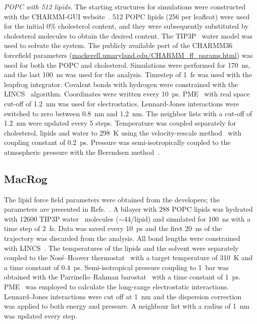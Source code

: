 \documentclass[journal=jacsat,manuscript=article]{achemso}
\begin{document}
{\it POPC with 512 lipids.}
%
The starting structures for simulations were constructed with
the CHARMM-GUI website~\cite{jo08}. 512 POPC lipids (256 per leafleat) were 
used for the initial 0\% cholesterol content, and they were subsequently 
substituted by cholesterol molecules to obtain the desired content.
The TIP3P~\cite{jorgensen83} water model was used to solvate the system. 
The publicly available port of the CHARMM36~\cite{klauda10} forcefield parameters (\url{mackerell.umaryland.edu/CHARMM_ff_params.html}) 
was used for both the POPC and cholesterol. 
Simulations were performed for 170~ns, and the last 100~ns was used for the analysis.
Timestep of 1~fs was used with the leapfrog integrator. Covalent bonds with hydrogen 
were constrained with the LINCS~\cite{hess97,hess07} algorithm. Coordinates were written every 10~ps.
PME~\cite{darden93,essman95} with real space cut-off of 1.2~nm was used for electrostatics. Lennard-Jones 
interactions were switched to zero between 0.8~nm and 1.2~nm. The neighbor lists with a
cut-off of 1.2~nm were updated every 5 steps. Temperature was coupled separately for cholesterol, lipids
and water to 298~K using the velocity-rescale method~\cite{bussi07} with coupling constant of 0.2~ps.
Pressure was semi-isotropically coupled to the atmospheric pressure with the Berendsen
method~\cite{berendsen84}.

\subsection{MacRog}
The lipid force field parameters were obtained from the developers; the parameters are presented in Refs.~. 
A bilayer with 288 POPC lipids was hydrated with 12600 TIP3P water~\cite{jorgensen83} molecules ($\sim$44/lipid) and simulated for 100~ns with a time step of 2~fs. Data was saved 
every 10~ps and the first 20~ns of the trajectory was discarded from the analysis. 
All bond lengths were constrained with LINCS~\cite{hess97,hess07}. The temperatures of the lipids and the solvent were separately coupled to the Nos\'{e}--Hoover thermostat~\cite{nose84,hoover85} 
with a target temperature of 310~K and a time constant of 0.4~ps. Semi-isotropical pressure coupling to 1~bar was obtained with the Parrinello--Rahman 
barostat~\cite{parrinello81} with a time constant of 1~ps. PME~\cite{darden93,essman95} was employed to calculate the long-range electrostatic interactions. Lennard-Jones interactions were cut off 
at 1~nm and the dispersion correction was applied to both energy and pressure. A neighbour list with a radius of 1~nm was updated every step. 
\end{document}
